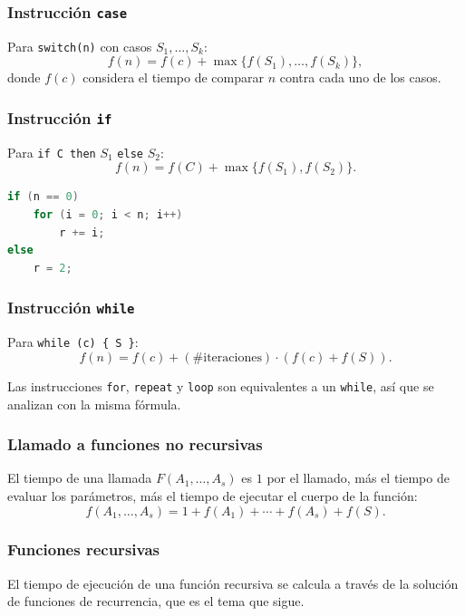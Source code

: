 \documentclass[11pt,letterpaper]{article}
\begin{document}
\subsubsection*{Instrucción \texttt{case}}

Para \texttt{switch(n)} con casos $S_1, \dots, S_k$:
\[
    f(n) = f(c) + \max\{f(S_1), \dots, f(S_k)\} ,
\]
donde $f(c)$ considera el tiempo de comparar $n$ contra cada uno de
los casos.

\subsubsection*{Instrucción \texttt{if}}

Para \texttt{if C then} $S_1$ \texttt{else} $S_2$:
\[
    f(n) = f(C) + \max\{f(S_1), f(S_2)\} .
\]

\begin{lstlisting}[language=C]
if (n == 0)
    for (i = 0; i < n; i++)
        r += i;
else
    r = 2;
\end{lstlisting}

\subsubsection*{Instrucción \texttt{while}}

Para \texttt{while (c) \{ S \}}:
\[
    f(n) = f(c) + (\text{\#iteraciones}) \cdot (f(c) + f(S)) .
\]

\begin{ojo}
    Las instrucciones \texttt{for}, \texttt{repeat} y \texttt{loop}
    son equivalentes a un \texttt{while}, así que se analizan con la
    misma fórmula.
\end{ojo}

\subsubsection*{Llamado a funciones no recursivas}

El tiempo de una llamada $F(A_1, \dots, A_s)$ es $1$ por el llamado,
más el tiempo de evaluar los parámetros, más el tiempo de ejecutar el
cuerpo de la función:
\[
    f(A_1, \dots, A_s) = 1 + f(A_1) + \cdots + f(A_s) + f(S) .
\]

\subsubsection*{Funciones recursivas}

El tiempo de ejecución de una función recursiva se calcula a través de
la solución de funciones de recurrencia, que es el tema que sigue.
\end{document}
